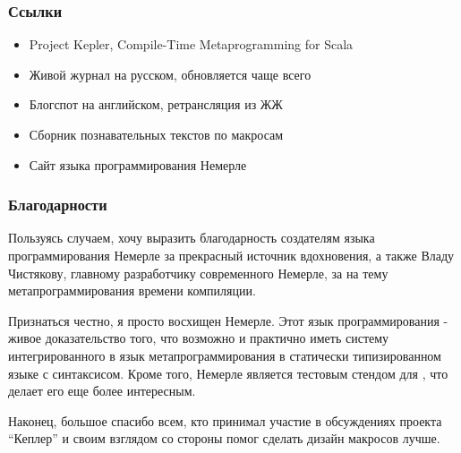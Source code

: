 \documentclass[hyperref={bookmarks=false}]{beamer}
\begin{document}
\begin{frame}[t]
\frametitle{Ссылки}
\begin{itemize}

\item Project Kepler, Compile-Time Metaprogramming for Scala\\

\item Живой журнал на русском, обновляется чаще всего\\

\item Блогспот на английском, ретрансляция из ЖЖ\\

\item Сборник познавательных текстов по макросам\\

\item Сайт языка программирования Немерле\\

\end{itemize}
\end{frame}

\begin{frame}[t]
\frametitle{Благодарности}

Пользуясь случаем, хочу выразить благодарность создателям языка программирования Немерле за прекрасный источник вдохновения, а также Владу Чистякову, главному разработчику современного Немерле, за  на тему метапрограммирования времени компиляции.

Признаться честно, я просто восхищен Немерле. Этот язык программирования - живое доказательство того, что возможно и практично иметь систему интегрированного в язык метапрограммирования в статически типизированном языке с синтаксисом. Кроме того, Немерле является тестовым стендом для , что делает его еще более интересным.

Наконец, большое спасибо всем, кто принимал участие в обсуждениях проекта ``Кеплер'' и своим взглядом со стороны помог сделать дизайн макросов лучше.
\end{frame}
\end{document}
